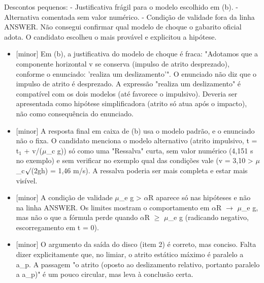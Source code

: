 \documentclass{article}%
\begin{document}
Descontos pequenos:\newline%
{-} Justificativa frágil para o modelo escolhido em (b).\newline%
{-} Alternativa comentada sem valor numérico.\newline%
{-} Condição de validade fora da linha ANSWER.\newline%
\newline%
Não consegui confirmar qual modelo de choque o gabarito oficial adota. O candidato escolheu o mais provável e explicitou a hipótese.%
\begin{itemize}%
\item%
{[}minor{]} Em (b), a justificativa do modelo de choque é fraca: "Adotamos que a componente horizontal v se conserva (impulso de atrito desprezado), conforme o enunciado: 'realiza um deslizamento'". O enunciado não diz que o impulso de atrito é desprezado. A expressão "realiza um deslizamento" é compatível com os dois modelos (até favorece o impulsivo). Deveria ser apresentada como hipótese simplificadora (atrito só atua após o impacto), não como consequência do enunciado.%
\item%
{[}minor{]} A resposta final em caixa de (b) usa o modelo padrão, e o enunciado não o fixa. O candidato menciona o modelo alternativo (atrito impulsivo, t = t$_{1}$ + v/($\mu$\_c g)) só como uma "Ressalva" curta, sem valor numérico (4,151 s no exemplo) e sem verificar no exemplo qual das condições vale (v = 3,10 > $\mu$\_c$\surd$(2gh) = 1,46 m/s). A ressalva poderia ser mais completa e estar mais visível.%
\item%
{[}minor{]} A condição de validade $\mu$\_e g > $\alpha$R aparece só nas hipóteses e não na linha ANSWER. Os limites mostram o comportamento em $\alpha$R $\to$ $\mu$\_e g, mas não o que a fórmula perde quando $\alpha$R $\geq$ $\mu$\_e g (radicando negativo, escorregamento em t = 0).%
\item%
{[}minor{]} O argumento da saída do disco (item 2) é correto, mas conciso. Falta dizer explicitamente que, no limiar, o atrito estático máximo é paralelo a a\_p. A passagem "o atrito (oposto ao deslizamento relativo, portanto paralelo a a\_p)" é um pouco circular, mas leva à conclusão certa.%
\end{itemize}%
\end{document}
